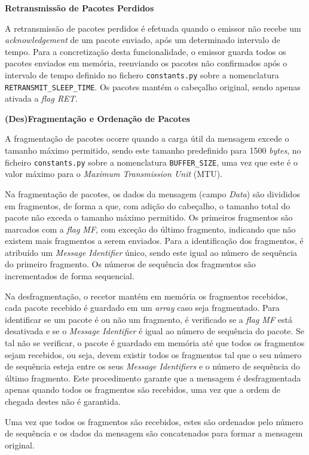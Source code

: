 \documentclass[a4paper,12pt]{scrreprt}
\begin{document}
\textbf{Retransmissão de Pacotes Perdidos}

A retransmissão de pacotes perdidos é efetuada quando o emissor não recebe um
\textit{acknowledgement} de um pacote enviado, após um determinado intervalo de
tempo. Para a concretização desta funcionalidade, o emissor guarda todos os pacotes
enviados em memória, reenviando os pacotes não confirmados após o intervalo de tempo
definido no fichero \texttt{constants.py} sobre a nomenclatura \texttt{RETRANSMIT\_SLEEP\_TIME}.
Os pacotes mantém o cabeçalho original, sendo apenas ativada a \textit{flag RET}.


\textbf{(Des)Fragmentação e Ordenação de Pacotes}

A fragmentação de pacotes ocorre quando a carga útil da mensagem excede o tamanho
máximo permitido, sendo este tamanho predefinido para 1500 \textit{bytes}, no
ficheiro \texttt{constants.py} sobre a nomenclatura \texttt{BUFFER\_SIZE},
uma vez que este é o valor máximo para o \textit{Maximum Transmission Unit} (MTU).

Na fragmentação de pacotes, os dados da mensagem (campo \textit{Data}) são divididos em fragmentos,
de forma a que, com adição do cabeçalho, o tamanho total do pacote não exceda o tamanho
máximo permitido. Os primeiros fragmentos são marcados com a \textit{flag MF},
com exceção do último fragmento, indicando que não existem mais fragmentos a serem enviados.
Para a identificação dos fragmentos, é atribuído um \textit{Message Identifier} único, sendo
este igual ao número de sequência do primeiro fragmento. Os números de sequência dos fragmentos
são incrementados de forma sequencial.

Na desfragmentação, o recetor mantém em memória os fragmentos recebidos, cada pacote
recebido é guardado em um \textit{array} caso seja fragmentado. Para identificar
se um pacote é ou não um fragmento, é verificado se a \textit{flag MF} está desativada
e se o \textit{Message Identifier} é igual ao número de sequência do pacote. Se tal
não se verificar, o pacote é guardado em memória até que todos os fragmentos sejam
recebidos, ou seja, devem existir todos os fragmentos tal que o seu número de sequência
esteja entre os seus \textit{Message Identifiers} e o número de sequência do último fragmento.
Este procedimento garante que a mensagem é desfragmentada apenas quando todos os
fragmentos são recebidos, uma vez que a ordem de chegada destes não é garantida.

Uma vez que todos os fragmentos são recebidos, estes são ordenados pelo número de
sequência e os dados da mensagem são concatenados para formar a mensagem original.
\end{document}
